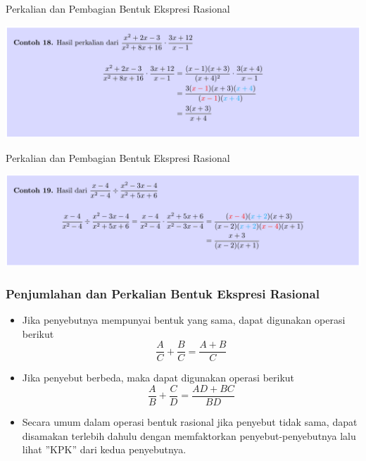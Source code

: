 \documentclass[pdflatex,compress,mathserif]{beamer}
\begin{document}
\begin{frame}{Perkalian dan Pembagian Bentuk Ekspresi Rasional}
	\begin{center}
		\includegraphics[width=\linewidth]{img/img35}
	\end{center}
\end{frame}

\begin{frame}{Perkalian dan Pembagian Bentuk Ekspresi Rasional}
	\begin{center}
		\includegraphics[width=\linewidth]{img/img36}
	\end{center}
\end{frame}

\begin{frame}
	\frametitle{Penjumlahan dan Perkalian Bentuk Ekspresi Rasional}
	\begin{itemize}
		\item Jika penyebutnya mempunyai bentuk yang sama, dapat digunakan operasi berikut
		\begin{equation*}
			\frac{A}{C} + \frac{B}{C} = \frac{A + B}{C}
		\end{equation*}
		\item Jika penyebut berbeda, maka dapat digunakan operasi berikut
		\begin{equation*}
			\frac{A}{B} + \frac{C}{D} = \frac{AD + BC}{BD}
		\end{equation*}
		\item Secara umum dalam operasi bentuk rasional jika penyebut tidak sama, dapat disamakan terlebih dahulu dengan memfaktorkan penyebut-penyebutnya lalu lihat ”KPK” dari kedua penyebutnya.
	\end{itemize}
\end{frame}
\end{document}
